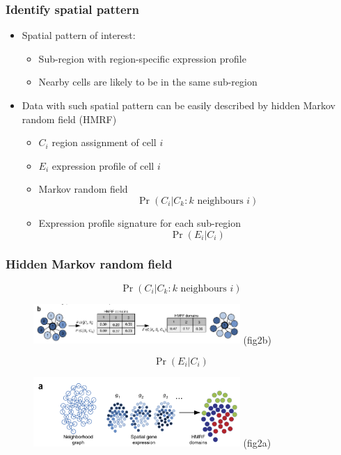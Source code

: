 \documentclass{beamer}
\begin{document}
  \begin{frame}
  \frametitle{Identify spatial pattern}
  \begin{itemize}
    \item Spatial pattern of interest:
    \begin{itemize}
      \item Sub-region with region-specific expression profile
      \item Nearby cells are likely to be in the same sub-region
    \end{itemize}
    \item Data with such spatial pattern can be easily described by hidden Markov random field (HMRF)
    \begin{itemize}
      \item $C_i$ region assignment of cell $i$
      \item $E_i$ expression profile of cell $i$
      \item Markov random field
        $$\Pr(C_i | C_k: k \text{ neighbours } i)$$
      \item Expression profile signature for each sub-region
        $$\Pr(E_i | C_i)$$
    \end{itemize}
  \end{itemize}
  \end{frame}

  \begin{frame}
  \frametitle{Hidden Markov random field}
  $$\Pr(C_i | C_k: k \text{ neighbours } i)$$
  \begin{figure}
    \centering
    \includegraphics[width=0.7\textwidth]{mrf} (fig2b)
  \end{figure}
  $$\Pr(E_i | C_i)$$
  \begin{figure}
    \centering
    \includegraphics[width=0.7\textwidth]{hmrf} (fig2a)
  \end{figure}
  \end{frame}
\end{document}
